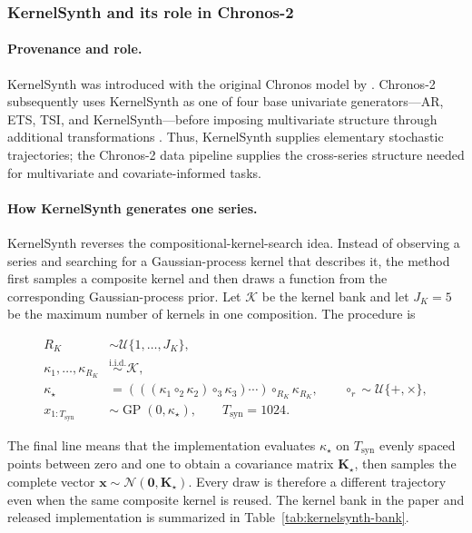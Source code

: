 \subsubsection{KernelSynth and its role in Chronos-2}

\paragraph{Provenance and role.}
KernelSynth was introduced with the original Chronos model by
\citet{ansari2024chronos}. Chronos-2 subsequently uses KernelSynth as one of
four base univariate generators---AR, ETS, TSI, and KernelSynth---before
imposing multivariate structure through additional transformations
\citep{ansari2025chronos2}. Thus, KernelSynth supplies elementary stochastic
trajectories; the Chronos-2 data pipeline supplies the cross-series structure
needed for multivariate and covariate-informed tasks.

\paragraph{How KernelSynth generates one series.}
KernelSynth reverses the compositional-kernel-search idea. Instead of observing
a series and searching for a Gaussian-process kernel that describes it, the
method first samples a composite kernel and then draws a function from the
corresponding Gaussian-process prior. Let $\mathcal K$ be the kernel bank and
let $J_K=5$ be the maximum number of kernels in one composition. The procedure
is

\begin{equation}
\begin{aligned}
R_K &\sim \mathcal U\{1,\ldots,J_K\},\\
\kappa_1,\ldots,\kappa_{R_K}
    &\overset{\mathrm{i.i.d.}}{\sim}\mathcal K,\\
\kappa_\star
    &=(((\kappa_1\circ_2\kappa_2)\circ_3\kappa_3)\cdots)
      \circ_{R_K}\kappa_{R_K},
      \qquad \circ_r\sim\mathcal U\{+,\times\},\\
x_{1:T_{\mathrm{syn}}}
    &\sim \operatorname{GP}(0,\kappa_\star),
    \qquad T_{\mathrm{syn}}=1024.
\end{aligned}
\label{eq:kernelsynth}
\end{equation}

The final line means that the implementation evaluates $\kappa_\star$ on
$T_{\mathrm{syn}}$ evenly spaced points between zero and one to obtain a
covariance matrix $\mathbf K_\star$, then samples the complete vector
$\mathbf x\sim\mathcal N(\mathbf 0,\mathbf K_\star)$. Every draw is therefore
a different trajectory even when the same composite kernel is reused. The
kernel bank in the paper and released implementation is summarized in
Table~\ref{tab:kernelsynth-bank}.

